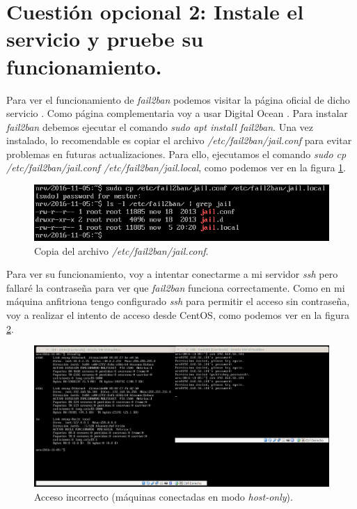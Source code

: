 \documentclass[a4paper,titlepage,12pt]{report}	%
\numberwithin{figure}{section} %
\numberwithin{table}{section} %
\begin{document}
	\section[Cuestión opcional 2: Instale el servicio y pruebe su funcionamiento.]{Cuestión opcional 2: Instale el servicio y pruebe su funcionamiento.}

	Para ver el funcionamiento de \textit{fail2ban} podemos visitar la página oficial de dicho servicio \cite{fail2ban}. Como página complementaria voy a usar Digital Ocean \cite{fail2bandigitalocean}. Para instalar \textit{fail2ban} debemos ejecutar el comando \textit{sudo apt install fail2ban}. Una vez instalado, lo recomendable es copiar el archivo \textit{/etc/fail2ban/jail.conf} para evitar problemas en futuras actualizaciones. Para ello, ejecutamos el comando \textit{sudo cp /etc/fail2ban/jail.conf /etc/fail2ban/jail.local}, como podemos ver en la figura \ref{P2-O2-copiarjail}.
	\begin{figure}[H]
		\centering
		\includegraphics[scale=0.53]{./Imagenes/P2/O2-copiarjail.png}
		\caption[Copia del archivo \textit{/etc/fail2ban/jail.conf}.]{Copia del archivo \textit{/etc/fail2ban/jail.conf}.}
		\label{P2-O2-copiarjail}
	\end{figure}

	Para ver su funcionamiento, voy a intentar conectarme a mi servidor \textit{ssh} pero fallaré la contraseña para ver que \textit{fail2ban} funciona correctamente. Como en mi máquina anfitriona tengo configurado \textit{ssh} para permitir el acceso sin contraseña, voy a realizar el intento de acceso desde CentOS, como podemos ver en la figura \ref{P2-O2-accesomal}.
	\begin{figure}[H]
		\includegraphics[width=\linewidth]{./Imagenes/P2/O2-accesomal.png}
		\vspace{-0.5cm}
		\caption[Acceso incorrecto (máquinas conectadas en modo \textit{host-only}).]{Acceso incorrecto (máquinas conectadas en modo \textit{host-only}).}
		\label{P2-O2-accesomal}
	\end{figure}
\end{document}
